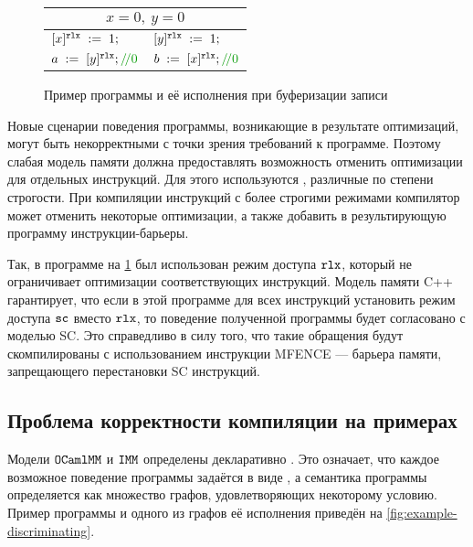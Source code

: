 \begin{figure}[h]
  \centering
  \begin{tabular}{l || l}
    \multicolumn{2}{c}{$x = 0,\ y = 0$} \\
    \hline
    $[x]^{\mathtt{rlx}}\;:=\;1;$ & $[y]^{\mathtt{rlx}}\;:=\;1;$ \\
    $\readInst{a}{y}{0}{\rlx}$ & $\readInst{b}{x}{0}{\rlx}$ \\
  \end{tabular}
  \caption{Пример программы и её исполнения при буферизации записи}
  \label{fig:store-buffering}
\end{figure}

Новые сценарии поведения программы, возникающие в результате оптимизаций, могут быть некорректными с точки зрения требований к программе. Поэтому слабая модель памяти должна предоставлять возможность отменить оптимизации для отдельных инструкций. Для этого используются , различные по степени строгости.
При компиляции инструкций с более строгими режимами компилятор может отменить некоторые оптимизации, а также добавить в результирующую программу инструкции-барьеры. 

Так, в программе на \cref{fig:store-buffering} был использован режим доступа $\mathtt{rlx}$, который не ограничивает оптимизации соответствующих инструкций. Модель памяти C++ гарантирует, что если в этой программе для всех инструкций установить режим доступа ${\mathtt{sc}}$ вместо $\mathtt{rlx}$, то поведение полученной программы будет согласовано с моделью SC. Это справедливо в силу того, что  такие обращения будут скомпилированы с использованием инструкции MFENCE \cite{cpp-mappings} --- барьера памяти, запрещающего перестановки SC инструкций.

\subsection{Проблема корректности компиляции на примерах} \label{corr-comp-example}

Модели $\mathtt{OCaml}\allowbreak \mathtt{MM}$ и $\mathtt{IMM}$ определены декларативно \cite{power}. Это означает, что каждое возможное поведение программы задаётся в виде , а семантика программы определяется как множество графов, удовлетворяющих некоторому условию. Пример программы и одного из графов её исполнения приведён на \cref{fig:example-discriminating}.

